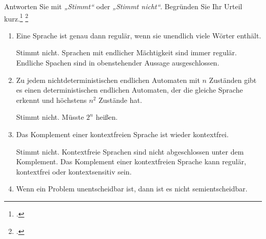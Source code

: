 \documentclass{bschlangaul-aufgabe}
\begin{document}

Antworten Sie mit \emph{„Stimmt“} oder \emph{„Stimmt nicht“}. Begründen
Sie Ihr Urteil kurz.\footcite[Seite 55-56]{theo:fs:4}
\footcite{examen:66115:2020:09}


\begin{enumerate}


\item Eine Sprache ist genau dann regulär, wenn sie unendlich viele
Wörter enthält.

\begin{bAntwort}
Stimmt nicht. Sprachen mit endlicher Mächtigkeit sind immer regulär.
Endliche Spachen sind in obenstehender Aussage ausgeschlossen.
\end{bAntwort}


\item Zu jedem nichtdeterministischen endlichen Automaten mit $n$
Zuständen gibt es einen deterministischen endlichen Automaten, der die
gleiche Sprache erkennt und höchstens $n^2$ Zustände hat.

\begin{bAntwort}
Stimmt nicht. Müsste $2^n$ heißen.
\end{bAntwort}


\item Das Komplement einer kontextfreien Sprache ist wieder kontextfrei.

\begin{bAntwort}
Stimmt nicht. Kontextfreie Sprachen sind nicht abgeschlossen unter dem
Komplement. Das Komplement einer kontextfreien Sprache kann regulär,
kontextfrei oder kontextsensitiv sein.
\end{bAntwort}


\item Wenn ein Problem unentscheidbar ist, dann ist es nicht
semientscheidbar.


\end{enumerate}
\end{document}
